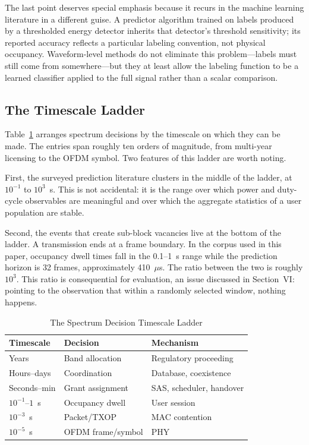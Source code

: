 \documentclass[lettersize,journal]{IEEEtran}
\newcommand{\us}{\ensuremath{\mu}s}
\begin{document}
The last point deserves special emphasis because it recurs in the machine
learning literature in a different guise.
A predictor algorithm trained on labels produced by a thresholded energy
detector inherits that detector's threshold sensitivity; its reported accuracy
reflects a particular labeling convention, not physical occupancy.
Waveform-level methods do not eliminate this problem---labels
must still come from somewhere---but they at least allow the labeling
function to be a learned classifier applied to the full signal rather
than a scalar comparison.

\subsection{\textbf{The Timescale Ladder}}
Table~\ref{tab:timescales} arranges spectrum decisions by the timescale
on which they can be made.
The entries span roughly ten orders of
magnitude, from multi-year licensing to the OFDM symbol.
Two features of this ladder are worth noting.

First, the surveyed prediction literature clusters in the middle of the
ladder, at $10^{-1}$ to $10^{3}$~s.
This is not accidental: it is the
range over which power and duty-cycle observables are meaningful and
over which the aggregate statistics of a user population are stable.

Second, the events that create sub-block vacancies live at the bottom of
the ladder.
A transmission ends at a frame boundary.
In the corpus used in this paper, occupancy dwell times fall in
the 0.1--1~s range while the prediction horizon is 32 frames,
approximately 410~\us.
The ratio between the two is roughly $10^{3}$.
This ratio is consequential for evaluation, an issue discussed in
Section~VI: pointing to the observation that within a randomly selected
window, nothing happens.

\begin{table}[t]
\centering
\caption{The Spectrum Decision Timescale Ladder}
\label{tab:timescales}
\renewcommand{\arraystretch}{1.2}
\begin{tabular}{@{}lll@{}}
\toprule
\textbf{Timescale} & \textbf{Decision} & \textbf{Mechanism} \\
\midrule
Years        & Band allocation        & Regulatory proceeding \\
Hours--days  & Coordination           & Database, coexistence \\
Seconds--min & Grant assignment       & SAS, scheduler, handover \\
$10^{-1}$--$1$~s & Occupancy dwell    & User session \\
$10^{-3}$~s  & Packet/TXOP            & MAC contention \\
$10^{-5}$~s  & OFDM frame/symbol      & PHY \\
\bottomrule
\end{tabular}
\end{table}
\end{document}
